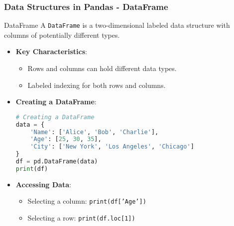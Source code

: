\documentclass[aspectratio=169]{beamer}
\begin{document}
\begin{frame}[fragile]
    \frametitle{Data Structures in Pandas - DataFrame}
    \begin{block}{DataFrame}
        A \texttt{DataFrame} is a two-dimensional labeled data structure with columns of potentially different types.
    \end{block}
    \begin{itemize}
        \item \textbf{Key Characteristics}:
        \begin{itemize}
            \item Rows and columns can hold different data types.
            \item Labeled indexing for both rows and columns.
        \end{itemize}
        \item \textbf{Creating a DataFrame}:
        \begin{lstlisting}[language=Python]
# Creating a DataFrame
data = {
    'Name': ['Alice', 'Bob', 'Charlie'],
    'Age': [25, 30, 35],
    'City': ['New York', 'Los Angeles', 'Chicago']
}
df = pd.DataFrame(data)
print(df)
        \end{lstlisting}
        \item \textbf{Accessing Data}:
        \begin{itemize}
            \item Selecting a column: \texttt{print(df['Age'])}
            \item Selecting a row: \texttt{print(df.loc[1])}
        \end{itemize}
    \end{itemize}
\end{frame}
\end{document}
